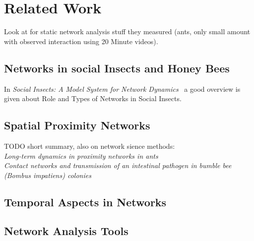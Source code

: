 \chapter{Related Work}

Look at \cite{quevillon2015social} for static network analysis stuff they measured (ants, only small amount with observed interaction using 20 Minute videos).

\section{Networks in social Insects and Honey Bees}

In \emph{Social Insects: A Model System for Network Dynamics}~\cite{charbonneau2013social} a good overview is given about Role and Types of Networks in Social Insects.

\section{Spatial Proximity Networks}

TODO short summary, also on network sience methods:\\
\emph{Long-term dynamics in proximity networks in ants}~\cite{jeanson2012long}\\

\emph{Contact networks and transmission of an intestinal pathogen in bumble bee (Bombus impatiens) colonies}~\cite{otterstatter2007contact}

\section{Temporal Aspects in Networks}

\section{Network Analysis Tools}